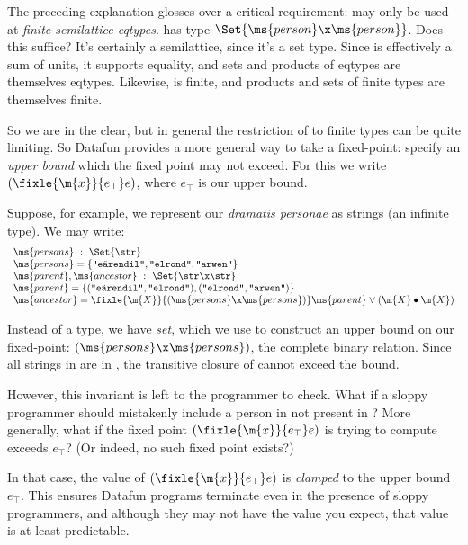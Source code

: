 The preceding explanation glosses over a critical requirement:  may only
be used at \emph{finite semilattice eqtypes}.  has type
$\Set{\ms{person} \x \ms{person}}$. Does this suffice? It's certainly a
semilattice, since it's a set type. Since  is effectively a sum of
units, it supports equality, and sets and products of eqtypes are themselves
eqtypes. Likewise,  is finite, and products and sets of finite types
are themselves finite.

So we are in the clear, but in general the restriction of
 to finite types can be quite limiting. So Datafun provides
a more general way to take a fixed-point: specify an \emph{upper bound} which
the fixed point may not exceed. For this we write $(\fixle{\m{x}}{e_\top} e)$,
where $e_\top$ is our upper bound.

Suppose, for example, we represent our \textit{dramatis personae} as strings (an
infinite type). We may write:
\[\begin{array}{l}
\ms{persons} ~:~ \Set{\str}\\
\ms{persons} = \{\texttt{"e\"arendil"}, \texttt{"elrond"}, \texttt{"arwen"}\}\\
\ms{parent}, \ms{ancestor} ~:~ \Set{\str \x \str}\\
\ms{parent} = \{(\texttt{"e\"arendil"}, \texttt{"elrond"}),
(\texttt{"elrond"}, \texttt{"arwen"})\}\\
\ms{ancestor} = \fixle{\m{X}}{(\ms{persons} \x \ms{persons})}
\ms{parent} \vee (\m{X} \bullet \m{X})
\end{array}\]

Instead of a  type, we have  \emph{set}, which we use to
construct an upper bound on our fixed-point: $(\ms{persons} \x \ms{persons})$, the
complete binary relation. Since all strings in  are in
, the transitive closure of  cannot exceed the
bound.

However, this invariant is left to the programmer to check. What if a sloppy
programmer should mistakenly include a person in  not present in
? More generally, what if the fixed point $(\fixle{\m{x}}{e_\top} e)$
is trying to compute exceeds $e_\top$? (Or indeed, no such fixed point exists?)

In that case, the value of $(\fixle{\m{x}}{e_\top} e)$ is \emph{clamped} to the
upper bound $e_\top$. This ensures Datafun programs terminate even in the
presence of sloppy programmers, and although they may not have the value you
expect, that value is at least predictable.

